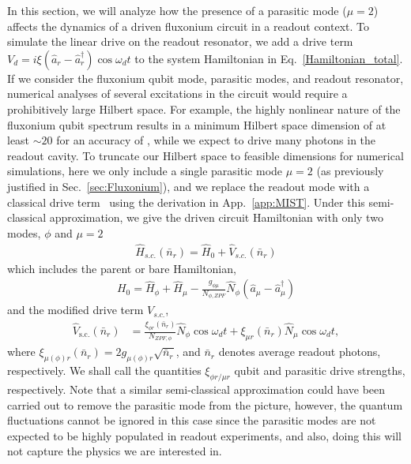 \documentclass[%
reprint,
superscriptaddress,
 amsmath,amssymb,
 aps,
 prx,
longbibliography,
floatfix,
]{revtex4-2}
\newcommand{\singh}[1]{{\color{orange}{{}#1}}}%
\begin{document}
 In this section, we will analyze how the presence of a parasitic mode ($\mu=2$) affects the dynamics of a driven fluxonium circuit in a readout context. To simulate the linear drive on the readout resonator, we add a drive term $V_d=i\xi (\hat a_r-\hat a_r^\dagger)\cos{\omega_d t}$ to the system Hamiltonian in Eq.~\ref{Hamiltonian_total}. If we consider the fluxonium qubit mode, parasitic modes, and readout resonator, numerical analyses of several excitations in the circuit would require a prohibitively large Hilbert space. For example, the highly nonlinear nature of the fluxonium qubit spectrum results in a minimum Hilbert space dimension of at least $\sim 20$ for an accuracy of \singh{$1 \ \mathrm{MHz}$~\cite{??}}, while we expect to drive many photons in the readout cavity. To truncate our Hilbert space to feasible dimensions for numerical simulations, here we only include a single parasitic mode $\mu=2$ (as previously justified in Sec.~\ref{sec:Fluxonium}), and we replace the readout mode with a classical drive term~\cite{cohen2023reminiscence,dumas2024unified,xiao2023diagrammatic} using the derivation in App.~\ref{app:MIST}. Under this semi-classical approximation, we give the driven circuit Hamiltonian with only two modes, $\phi$ and $\mu=2$
\begin{align}
  \hat H_{s.c.}(\bar n_r)=\hat H_0+\hat V_{s.c.}(\bar n_r)  \label{eq:drive_Ham}
\end{align}
 which includes the parent or bare Hamiltonian,
\begin{align}
H_0=\hat H_\phi+\hat H_{\mu}-\frac{g_{\phi\mu}}{N_{\phi,ZPF}} \hat N_\phi (\hat a_{\mu}-\hat a_{\mu}^\dagger) \label{eq:bare_ham} 
\end{align}
and the modified drive term $V_{s.c.}$,
\begin{align}
    \hat V_\textrm{s.c.}(\bar n_r)&=\frac{\xi_{\phi r}(\bar n_r)}{N_{ZPF,\phi}} \hat N_\phi\cos{\omega_d t}+\xi_{\mu r}(\bar n_r) \hat N_\mu\cos{\omega_d t}\label{eq:drive},
\end{align}
where $\xi_{\mu(\phi) r}(\bar n_r)=2g_{\mu(\phi) r}\sqrt{\bar n_r}$, and $\bar n_r$ denotes average readout photons, respectively. We shall call the quantities $\xi_{\phi r/\mu r}$ qubit and parasitic drive strengths, respectively. Note that a similar semi-classical approximation could have been carried out to remove the parasitic mode from the picture, however, the quantum fluctuations cannot be ignored in this case since the parasitic modes are not expected to be highly populated in readout experiments, and also, doing this will not capture the physics we are interested in. 
\end{document}
